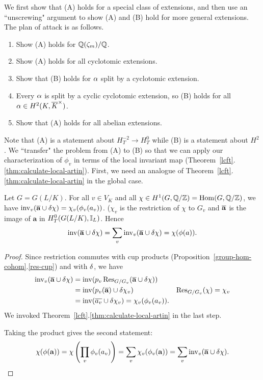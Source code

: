 We first show that (A) holds for a special class of extensions, and then use an ``unscrewing" argument to show (A) and (B) hold for more general extensions. The plan of attack is as follows.
\begin{enumerate}
\item
Show (A) holds for $\mathbb{Q}(\zeta_m)/\mathbb{Q}$.
\item 
Show (A) holds for all cyclotomic extensions.
\item
Show that (B) holds for $\alpha$ split by a cyclotomic extension.
\item
Every $\alpha$ is split by a cyclic cyclotomic extension, so (B) holds for all $\alpha\in H^2(K,\overline{K}^{\times})$.
\item
Show that (A) holds for all abelian extensions.
\end{enumerate}
Note that (A) is a statement about $H_T^{-2}\to H_T^0$ while (B) is a statement about $H^2$. We ``transfer" the problem from (A) to (B) so that we can apply our characterization of $\phi_v$ in terms of the local invariant map (Theorem~\ref{lcft}.\ref{thm:calculate-local-artin}). First, we need an analogue of Theorem~\ref{lcft}.\ref{thm:calculate-local-artin} in the global case.
\begin{lem}
Let $G=G(L/K)$. 
For all $v\in V_K$ and all $\chi\in H^1(G,\mathbb{Q}/\mathbb{Z})=\operatorname{Hom}(G,\mathbb{Q}/\mathbb{Z})$, we have $\operatorname{inv}_v(\overline{\mathbf a}\cup \delta \chi)=\chi_v(\phi_v(a_v))$. ($\chi_v$ is the restriction of $\chi$ to $G_v$ and $\overline{\mathbf a}$ is the image of $\mathbf a$ in $H_T^0(G(L/K),\mathbb{I}_L)$. Hence
\[
\operatorname{inv}(\overline{\mathbf a}\cup \delta \chi)=\sum_v \operatorname{inv}_v(\overline{\mathbf a}\cup \delta \chi)=\chi(\phi(a)).
\]
\end{lem}
\begin{proof}
Since restriction commutes with cup products (Proposition~\ref{group-hom-cohom}.\ref{res-cup}) and with $\delta$, we have
\begin{align*}
\operatorname{inv}_v(\overline{\mathbf a}\cup \delta \chi)&=\operatorname{inv}(p_v\operatorname{Res}_{G/G_v} (\overline{\mathbf a}\cup \delta \chi))\\
&=\operatorname{inv}(p_v(\overline{\mathbf a})\cup \delta\chi_v)&\operatorname{Res}_{G/G_v}(\chi)=\chi_v\\
&=\operatorname{inv}(\overline{a_v}\cup \delta \chi_v)=\chi_v(\phi_v(a_v)).
\end{align*}
We invoked Theorem~\ref{lcft}.\ref{thm:calculate-local-artin}  in the last step.

Taking the product gives the second statement:
\[
\chi(\phi(\mathbf a))=\chi\left( {\prod_v \phi_v(a_v)} \right)=\sum_v\chi_v(\phi_v(\mathbf a))=\sum_v \operatorname{inv}_v(\overline{\mathbf a}\cup \delta\chi).
\]
\end{proof}
